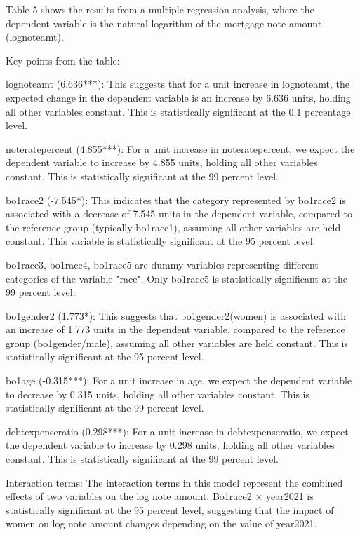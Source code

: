 \documentclass[12pt,english]{article}
\begin{document}
Table 5 shows the results from a multiple regression analysis, where the dependent variable is the natural logarithm of the mortgage note amount (lognoteamt). 

Key points from the table:

    lognoteamt (6.636***): This suggests that for a unit increase in lognoteamt, the expected change in the dependent variable is an increase by 6.636 units, holding all other variables constant. This is statistically significant at the 0.1 percentage level.

    noteratepercent (4.855***): For a unit increase in noteratepercent, we expect the dependent variable to increase by 4.855 units, holding all other variables constant. This is statistically significant at the 99 percent level.

    bo1race2 (-7.545*): This indicates that the category represented by bo1race2 is associated with a decrease of 7.545 units in the dependent variable, compared to the reference group (typically bo1race1), assuming all other variables are held constant. This variable is statistically significant at the 95 percent level.

    bo1race3, bo1race4, bo1race5 are dummy variables representing different categories of the variable "race". Only bo1race5 is statistically significant at the 99 percent level.

    bo1gender2 (1.773*): This suggests that bo1gender2(women) is associated with an increase of 1.773 units in the dependent variable, compared to the reference group (bo1gender/male), assuming all other variables are held constant. This is statistically significant at the 95 percent level.

    bo1age (-0.315***): For a unit increase in age, we expect the dependent variable to decrease by 0.315 units, holding all other variables constant. This is statistically significant at the 99 percent level.

    debtexpenseratio (0.298***): For a unit increase in debtexpenseratio, we expect the dependent variable to increase by 0.298 units, holding all other variables constant. This is statistically significant at the 99 percent level.

    Interaction terms: The interaction terms in this model represent the combined effects of two variables on the log note amount. Bo1race2 × year2021 is statistically significant at the 95 percent level, suggesting that the impact of women on log note amount changes depending on the value of year2021.
 
\end{document}

